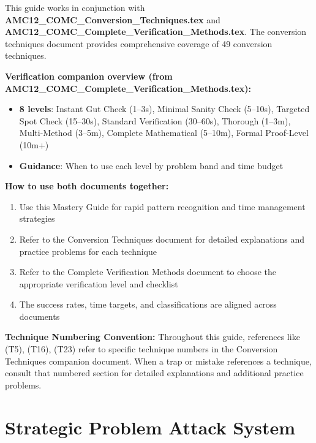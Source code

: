 \documentclass{article}
\begin{document}
\begin{tcolorbox}[colback=blue!5!white,colframe=blue!75!black,title={\textbf{Important: Companion Document}}]
This guide works in conjunction with \textbf{AMC12\_COMC\_Conversion\_Techniques.tex} and \\

\textbf{AMC12\_COMC\_Complete\_Verification\_Methods.tex}. The conversion techniques document provides comprehensive coverage of 49 conversion techniques.

\textbf{Verification companion overview (from AMC12\_COMC\_Complete\_Verification\_Methods.tex):}
\begin{itemize}[nosep]
\item \textbf{8 levels}: Instant Gut Check (1--3s), Minimal Sanity Check (5--10s), Targeted Spot Check (15--30s), Standard Verification (30--60s), Thorough (1--3m), Multi-Method (3--5m), Complete Mathematical (5--10m), Formal Proof-Level (10m+)
\item \textbf{Guidance}: When to use each level by problem band and time budget
\end{itemize}

\textbf{How to use both documents together:}
\begin{enumerate}[nosep]
\item Use this Mastery Guide for rapid pattern recognition and time management strategies
\item Refer to the Conversion Techniques document for detailed explanations and practice problems for each technique
\item Refer to the Complete Verification Methods document to choose the appropriate verification level and checklist
\item The success rates, time targets, and classifications are aligned across documents
\end{enumerate}

\textbf{Technique Numbering Convention:}
Throughout this guide, references like (T5), (T16), (T23) refer to specific technique numbers in the Conversion Techniques companion document. When a trap or mistake references a technique, consult that numbered section for detailed explanations and additional practice problems.
\end{tcolorbox}

\newpage

\section{Strategic Problem Attack System}
\label{sec:rapid-classification}
\end{document}
